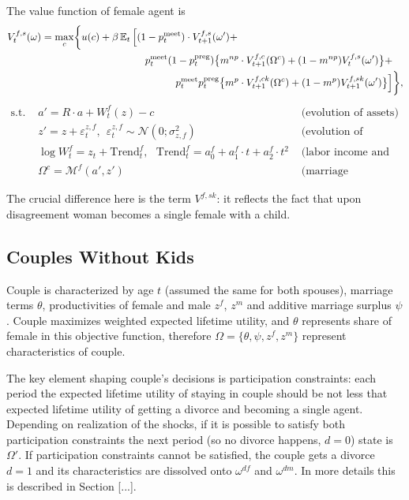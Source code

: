 The value function of female agent is
\begin{align}V^{f,s}_t(\omega) = \max\limits_{c} & \bigg\{ u(c) + \beta \E_t \Big[ (1 - p^{\text{meet}}_t)\cdot V^{f,s}_{t+1}(\omega') + \label{single-fem} \\  \nonumber
& \hspace{7em} p^{\text{meet}}_t (1-p^{\text{preg}}_t) \big\{ m^{np} \cdot V^{f,c}_{t+1}(\Omega^c) + (1-m^{np})V^{f,s}_t(\omega')\big\} + \\  \nonumber
& \hspace{10em} p^{\text{meet}}_t p^{\text{preg}}_t \big\{ m^{p} \cdot V^{f,ck}_{t+1}(\Omega^c) + (1-m^{p})V^{f,sk}_{t+1}(\omega')\big\}  \Big]  \bigg\},
\end{align}\vspace{-3em}
\begin{align*}
 \text{s.t. \ }  &  a' = R\cdot a  + W^f_t(z) - c  & \text{ (evolution of assets)}\\
 &  z' = z + \varepsilon^{z,f}_t, \ \ \varepsilon^{z,f}_t \sim \mathcal{N}(0;\sigma_{z,f}^2) &  \text{ (evolution of productivity)}\\
  & \log W^f_t = z_t + \text{Trend}^f_t, \ \ \  \text{Trend}^f_t = a^f_0 + a^f_1\cdot t  +  a^f_2 \cdot t^2 &  \text{ (labor income and trend)}\\
  & \Omega^c = \mathcal{M}^f(a',z') &  \text{ (marriage prospectives)}
\end{align*}

% 
The crucial difference here is the term $V^{f,sk}$: it reflects the fact that upon disagreement woman becomes a single female with a child. 

\subsection{Couples Without Kids}
Couple is characterized by age $t$ (assumed the same for both spouses), marriage terms $\theta$, productivities of female and male $z^f$, $z^m$ and additive marriage surplus $\psi$. Couple maximizes weighted expected lifetime utility, and $\theta$ represents share of female in this objective function, therefore $\Omega = \{\theta,\psi,z^f,z^m\}$ represent characteristics of couple.

The key element shaping couple's decisions is participation constraints: each period the expected lifetime utility of staying in couple should be not less that expected lifetime utility of getting a divorce and becoming a single agent. Depending on realization of the shocks, if it is possible to satisfy both participation constraints the next period (so no divorce happens, $d = 0$) state is $\Omega'$. If participation constraints cannot be satisfied, the couple gets a divorce $d = 1$ and its characteristics are dissolved onto $\omega^{df}$ and $\omega^{dm}$.  In more details this is described in Section [...].

